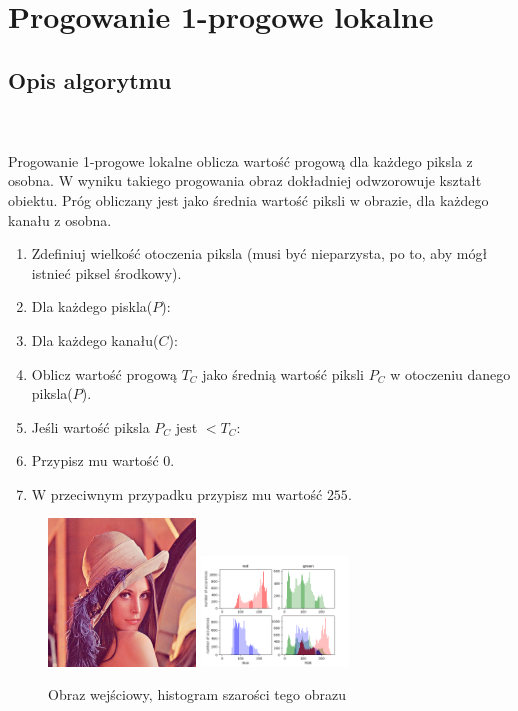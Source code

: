 \documentclass[final,a4paper,openany,12pt]{mwbk}
\begin{document}
\newpage



\section{Progowanie 1-progowe lokalne}
\subsection*{Opis algorytmu}
\hfill
\\\\
\indent Progowanie 1-progowe lokalne oblicza wartość progową dla każdego piksla z osobna. W wyniku takiego progowania obraz dokładniej odwzorowuje kształt obiektu. Próg obliczany jest jako średnia wartość piksli w obrazie, dla każdego kanału z osobna.
\begin{enumerate}
	\item Zdefiniuj wielkość otoczenia piksla (musi być nieparzysta, po to, aby mógł istnieć piksel środkowy).
	\item Dla każdego piskla($P$):
	\item Dla każdego kanału($C$):
	\item Oblicz wartość progową $T_C$ jako średnią wartość piksli $P_C$ w otoczeniu danego piksla($P$).
	\item Jeśli wartość piksla $P_C$ jest $< T_C$:
	\item Przypisz mu wartość $0$.
	\item W przeciwnym przypadku przypisz mu wartość $255$.
\end{enumerate}

\begin{figure}[H]
	\begin{center}
		\includegraphics[width=0.35\textwidth]{lena_color}
		\includegraphics[width=0.35\textwidth]{lena_color_histogram}
	\end{center}
	\caption{Obraz wejściowy, histogram szarości tego obrazu}
\end{figure}
\end{document}
